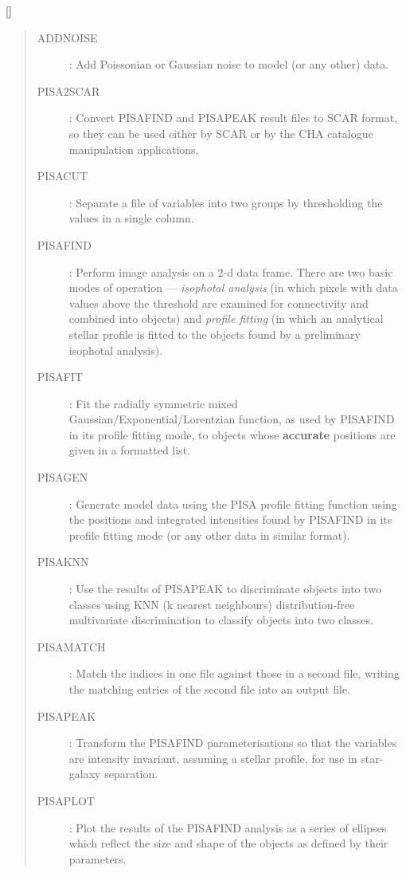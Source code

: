 \vspace{-10mm}

\hfill []

\vspace{2mm}

\begin{quote}
\begin{description}

\item [ADDNOISE] :
 Add Poissonian or Gaussian noise to model (or any other) data.

\item [PISA2SCAR] :
 Convert PISAFIND and PISAPEAK result files to SCAR format, so they can be
 used either by SCAR or by the CHA catalogue manipulation applications.

\item [PISACUT] :
 Separate a file of variables into two groups by thresholding the values in a
 single column.

\item [PISAFIND] : 
 Perform image analysis on a 2-d data frame.
 There are two basic modes of operation --- {\em isophotal analysis} (in which
 pixels  with data values above the threshold are examined for connectivity and
 combined into objects) and {\em profile fitting} (in which an analytical
 stellar profile is fitted to the objects found by a preliminary isophotal
 analysis).

\item [PISAFIT] :
 Fit the radially symmetric mixed Gaussian/Exponential/Lorentzian function,
 as used by PISAFIND in its profile fitting mode, to objects whose
 {\bf accurate} positions are given in a formatted list.

\item [PISAGEN] :
 Generate model data using the PISA profile fitting function using the positions
 and integrated intensities found by PISAFIND in its profile fitting mode (or
 any other data in similar format).

\item [PISAKNN] :
 Use the results of PISAPEAK to discriminate objects into two classes using
 KNN (k nearest neighbours) distribution-free multivariate discrimination to
 classify objects into two classes.

\item [PISAMATCH] :
 Match the indices in one file against those in a second file, writing the
 matching entries of the second file into an output file.

\item [PISAPEAK] :
 Transform the PISAFIND parameterisations so that the variables are intensity
 invariant, assuming a stellar profile, for use in star-galaxy separation.

\item [PISAPLOT] :
 Plot the results of the PISAFIND analysis as a series of ellipses which
 reflect the size and shape of the objects as defined by their parameters.

\end{description}
\end{quote}

